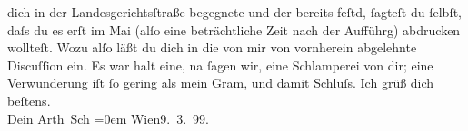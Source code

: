 \begin{ledgroupsized}[t]{13cm}
               dich in der Landesgerichtsſtraße begegnete und der
                  \label{K_L00903_2v}\label{K_L00903_2h} bereits feſtd, ſagteſt du ſelbſt, daſs du es erſt im Mai (alſo eine beträchtliche Zeit
               nach der Aufführg) abdrucken wollteſt.\pend
           \pstart
           Wozu alſo läßt du dich in die von mir von vornherein abgelehnte Discuſſion ein. Es
               war halt eine, na ſagen wir, eine Schlamperei von {\pb}dir; eine Verwunderung iſt ſo gering als mein Gram, und damit Schluſs.\pend
           \pstart
           Ich grüß dich beſtens.{\\[\baselineskip]}Dein \spacefill\mbox{Arth Sch}\pend
           \leftskip=0em{}\pstart
           Wien9. 3. 99.\pend
           \endnumbering{}\end{ledgroupsized}  \newcommand{\dateiname}{L00903}\newcommand{\titel}{Arthur Schnitzler an Hermann Bahr, 9. 3. 1899}\newcommand{\editorInnen}{ Kurt Ifkovits,  Martin Anton Müller}
      